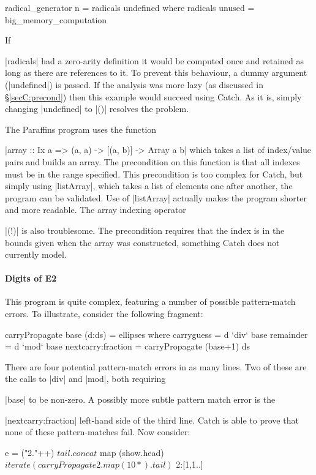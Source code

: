 \begin{code}
radical_generator n = radicals undefined
  where radicals unused = big_memory_computation
\end{code}

If \ignore|radicals| had a zero-arity definition it would be computed once and retained as long as there are references to it. To prevent this behaviour, a dummy argument (|undefined|) is passed. If the analysis was more lazy (as discussed in \S\ref{secC:precond}) then this example would succeed using Catch. As it is, simply changing |undefined| to |()| resolves the problem.

The Paraffins program uses the function \ignore|array :: Ix a => (a, a) -> [(a, b)] -> Array a b| which takes a list of index/value pairs and builds an array. The precondition on this function is that all indexes must be in the range specified. This precondition is too complex for Catch, but simply using |listArray|, which takes a list of elements one after another, the program can be validated. Use of |listArray| actually makes the program shorter and more readable. The array indexing operator \ignore|(!)| is also troublesome. The precondition requires that the index is in the bounds given when the array was constructed, something Catch does not currently model.


\paragraph{Digits of E2}

This program is quite complex, featuring a number of possible pattern-match errors. To illustrate, consider the following fragment:

\begin{code}
carryPropagate base (d:ds) = ellipses
  where  carryguess = d `div` base
         remainder = d `mod` base
         nextcarry:fraction = carryPropagate (base+1) ds
\end{code}

\noindent There are four potential pattern-match errors in as many lines. Two of these are the calls to |div| and |mod|, both requiring \ignore|base| to be non-zero. A possibly more subtle pattern match error is the \ignore|nextcarry:fraction| left-hand side of the third line. Catch is able to prove that none of these pattern-matches fail. Now consider:

\begin{code}
e =  ("2."++) $
     tail . concat $
     map (show.head) $
     iterate (carryPropagate 2 . map (10*) . tail) $
     2:[1,1..]
\end{code}

